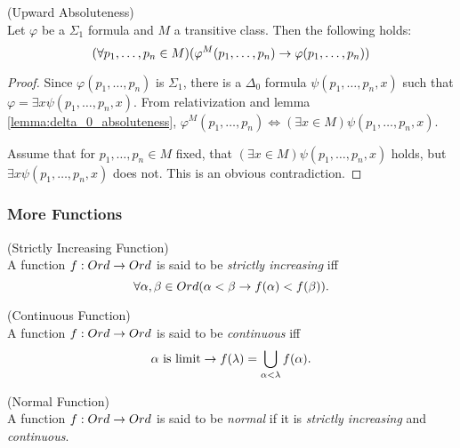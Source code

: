 \begin{lemma}{(Upward Absoluteness)}\label{lemma:upward_absoluteness}\\
Let $\varphi$ be a $\Sigma_1$ formula and $M$ a transitive class. Then the following holds:
\begin{equation}
(\forall p_1, \ldots, p_n \in M)(\varphi^M(p_1, \ldots, p_n) \rightarrow \varphi(p_1, \ldots, p_n))
\end{equation}
\end{lemma}
\begin{proof}
Since $\varphi(p_1, \ldots, p_n)$ is $\Sigma_1$, there is a $\Delta_0$ formula $\psi(p_1, \ldots, p_n, x)$ such that $\varphi = \exists x \psi(p_1, \ldots, p_n, x)$. From relativization and lemma \ref{lemma:delta_0_absoluteness}, $\varphi^M(p_1, \ldots, p_n) \iff (\exists x \in M)\psi(p_1, \ldots, p_n, x)$.

Assume that for $p_1, \ldots, p_n \in M$ fixed, that $(\exists x \in M)\psi(p_1, \ldots, p_n, x)$ holds, but $\exists x \psi(p_1, \ldots, p_n, x)$ does not. This is an obvious contradiction.
\end{proof}


\subsubsection{More Functions}

\begin{definition}{(Strictly Increasing Function)}\label{def:increasing_function}\\
A function $f: Ord \rightarrow Ord$ is said to be \emph{strictly increasing} iff
\begin{equation}
\forall \alpha, \beta \in Ord (\alpha < \beta \rightarrow f(\alpha) < f(\beta)).
\end{equation}
\end{definition}

\begin{definition}{(Continuous Function)}\label{def:continuous_function}\\
A function $f: Ord \rightarrow Ord$ is said to be \emph{continuous} iff
\begin{equation}
\alpha\mbox{ is limit} \rightarrow f(\lambda) = \bigcup_{\alpha < \lambda} f(\alpha).
\end{equation}
\end{definition}

\begin{definition}{(Normal Function)}\label{def:normal_function}\\
A function $f: Ord \rightarrow Ord$ is said to be \emph{normal} if it is \emph{strictly increasing} and \emph{continuous}.
\end{definition}


